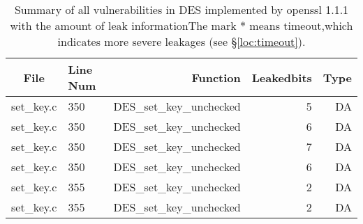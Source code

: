 \begin{table*}%
\centering
\caption{Summary of all vulnerabilities in DES implemented by openssl 1.1.1 with the amount of leak informationThe mark $*$ means timeout,which indicates more severe leakages (see \S\ref{loc:timeout}).}\label{tab:DESopenssl}
\begin{tabular}{clrrr}
\hline
\textbf{File} & \textbf{Line Num} & \textbf{Function} & \textbf{Leakedbits} & \textbf{Type} \\\hline
set\_key.c& 350&DES\_set\_key\_unchecked&5 &DA\\
set\_key.c& 350&DES\_set\_key\_unchecked&6 &DA\\
set\_key.c& 350&DES\_set\_key\_unchecked&7 &DA\\
set\_key.c& 350&DES\_set\_key\_unchecked&6 &DA\\
set\_key.c& 355&DES\_set\_key\_unchecked&2 &DA\\
set\_key.c& 355&DES\_set\_key\_unchecked&2 &DA\\
\hline
\end{tabular}
\end{table*}